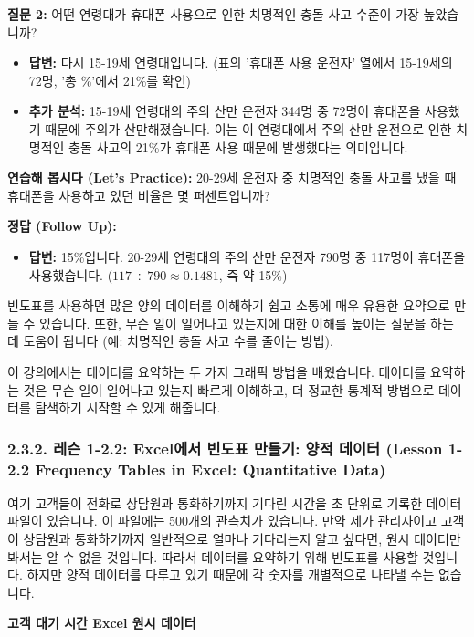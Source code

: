 \documentclass[11pt,a4paper]{book}
\providecommand{\captionof}[2]{\textbf{#2}}
\theoremstyle{definition}
\begin{document}
\begin{examplebox}
\textbf{질문 2:} 어떤 연령대가 휴대폰 사용으로 인한 치명적인 충돌 사고 수준이 가장 높았습니까?
\begin{itemize}
    \item \textbf{답변:} 다시 15-19세 연령대입니다. (표의 '휴대폰 사용 운전자' 열에서 15-19세의 72명, '총 \%'에서 21\%를 확인)
    \item \textbf{추가 분석:} 15-19세 연령대의 주의 산만 운전자 344명 중 72명이 휴대폰을 사용했기 때문에 주의가 산만해졌습니다. 이는 이 연령대에서 주의 산만 운전으로 인한 치명적인 충돌 사고의 21\%가 휴대폰 사용 때문에 발생했다는 의미입니다.
\end{itemize}

\textbf{연습해 봅시다 (Let's Practice):}
20-29세 운전자 중 치명적인 충돌 사고를 냈을 때 휴대폰을 사용하고 있던 비율은 몇 퍼센트입니까?

\textbf{정답 (Follow Up):}
\begin{itemize}
    \item \textbf{답변:} 15\%입니다. 20-29세 연령대의 주의 산만 운전자 790명 중 117명이 휴대폰을 사용했습니다. ($117 \div 790 \approx 0.1481$, 즉 약 15\%)
\end{itemize}
빈도표를 사용하면 많은 양의 데이터를 이해하기 쉽고 소통에 매우 유용한 요약으로 만들 수 있습니다. 또한, 무슨 일이 일어나고 있는지에 대한 이해를 높이는 질문을 하는 데 도움이 됩니다 (예: 치명적인 충돌 사고 수를 줄이는 방법).

이 강의에서는 데이터를 요약하는 두 가지 그래픽 방법을 배웠습니다. 데이터를 요약하는 것은 무슨 일이 일어나고 있는지 빠르게 이해하고, 더 정교한 통계적 방법으로 데이터를 탐색하기 시작할 수 있게 해줍니다.
\end{examplebox}


\subsubsection{2.3.2. 레슨 1-2.2: Excel에서 빈도표 만들기: 양적 데이터 (Lesson 1-2.2 Frequency Tables in Excel: Quantitative Data)}

\begin{tcolorbox}[title={Excel에서 고객 대기 시간 빈도표 만들기}]
여기 고객들이 전화로 상담원과 통화하기까지 기다린 시간을 초 단위로 기록한 데이터 파일이 있습니다. 이 파일에는 500개의 관측치가 있습니다. 만약 제가 관리자이고 고객이 상담원과 통화하기까지 일반적으로 얼마나 기다리는지 알고 싶다면, 원시 데이터만 봐서는 알 수 없을 것입니다. 따라서 데이터를 요약하기 위해 빈도표를 사용할 것입니다. 하지만 양적 데이터를 다루고 있기 때문에 각 숫자를 개별적으로 나타낼 수는 없습니다.

\begin{center}
\captionof{figure}{고객 대기 시간 Excel 원시 데이터}
\label{fig:excel_raw_data}
\end{center}
\end{tcolorbox}
\end{document}
